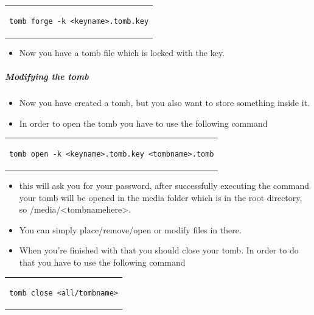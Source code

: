 \documentclass[a4paper,10pt]{article}
\begin{document}
\begin{center}
\begin{tabular}{c}
\begin{lstlisting}
tomb forge -k <keyname>.tomb.key
\end{lstlisting}
\end{tabular}
\end{center}

\begin{itemize}[leftmargin=*]
\item Now you have a tomb file which is locked with the key.\cite{dyne_2019}
\end{itemize}


\subparagraph{Modifying the tomb}

\begin{itemize}[leftmargin=*]
\item Now you have created a tomb, but you also want to store something inside it.
\item In order to open the tomb you have to use the following command
\end{itemize}

\begin{center}
\begin{tabular}{c}
\begin{lstlisting}
tomb open -k <keyname>.tomb.key <tombname>.tomb
\end{lstlisting}
\end{tabular}
\end{center}

\begin{itemize}[leftmargin=*]
\item this will ask you for your password, after successfully executing the command your tomb will be opened in the media folder which is in the root directory, so /media/<tombnamehere>.
\item You can simply place/remove/open or modify files in there.
\item When you're finished with that you should close your tomb. In order to do that you have to use the following command
\end{itemize}

\begin{center}
\begin{tabular}{c}
\begin{lstlisting}
tomb close <all/tombname>
\end{lstlisting}
\end{tabular}
\end{center}
\end{document}

